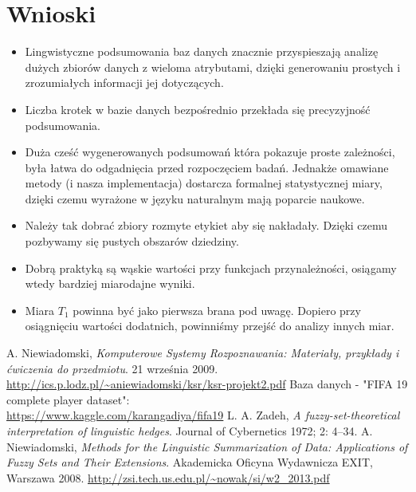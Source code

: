 \documentclass{classrep}
\begin{document}
\section{Wnioski}
\begin{itemize}
    \item Lingwistyczne podsumowania baz danych znacznie przyspieszają analizę dużych zbiorów danych z wieloma atrybutami, dzięki generowaniu prostych i zrozumiałych informacji jej dotyczących.
    \item Liczba krotek w bazie danych bezpośrednio przekłada się precyzyjność podsumowania.
    \item Duża cześć wygenerowanych podsumowań która pokazuje proste zależności, była łatwa do odgadnięcia przed rozpoczęciem badań. Jednakże omawiane metody (i nasza implementacja) dostarcza formalnej statystycznej miary, dzięki czemu wyrażone w języku naturalnym mają poparcie naukowe.
    \item Należy tak dobrać zbiory rozmyte etykiet aby się nakładały. Dzięki czemu pozbywamy się pustych obszarów dziedziny.
    \item Dobrą praktyką są wąskie wartości przy funkcjach przynależności, osiągamy wtedy bardziej miarodajne wyniki.
    \item Miara $T_1$ powinna być jako pierwsza brana pod uwagę. Dopiero przy osiągnięciu wartości dodatnich, powinniśmy przejść do analizy innych miar.
\end{itemize}

\begin{thebibliography}{}
    A. Niewiadomski,
    \emph{Komputerowe Systemy Rozpoznawania: Materiały, przykłady i ćwiczenia do przedmiotu}.
    21 września 2009.
    \url{http://ics.p.lodz.pl/~aniewiadomski/ksr/ksr-projekt2.pdf}
    Baza danych - "FIFA 19 complete player dataset":\\
    \url{https://www.kaggle.com/karangadiya/fifa19}    
    L. A. Zadeh,
    \emph{A fuzzy-set-theoretical interpretation of linguistic hedges}.
    Journal of Cybernetics 1972; 2: 4–34.
    A. Niewiadomski,
    \emph{Methods for the Linguistic Summarization of Data: Applications of Fuzzy Sets and Their Extensions}.
    Akademicka Oficyna Wydawnicza EXIT,
    Warszawa 2008.
    \url{http://zsi.tech.us.edu.pl/~nowak/si/w2_2013.pdf}
\end{thebibliography}
\end{document}
